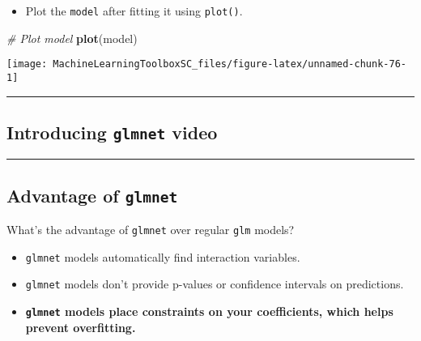 \documentclass[
]{book}
\newenvironment{Shaded}{\begin{snugshade}}{\end{snugshade}}
\newcommand{\CommentTok}[1]{\textcolor[rgb]{0.56,0.35,0.01}{\textit{#1}}}
\newcommand{\KeywordTok}[1]{\textcolor[rgb]{0.13,0.29,0.53}{\textbf{#1}}}
\newcommand{\NormalTok}[1]{#1}
\providecommand{\tightlist}{%
  \setlength{\itemsep}{0pt}\setlength{\parskip}{0pt}}
\begin{document}
\begin{itemize}
\tightlist
\item
  Plot the \texttt{model} after fitting it using \texttt{plot()}.
\end{itemize}

\begin{Shaded}
\begin{Highlighting}[]
\CommentTok{# Plot model}
\KeywordTok{plot}\NormalTok{(model)}
\end{Highlighting}
\end{Shaded}

\begin{center}\texttt{[image: MachineLearningToolboxSC\_files/figure-latex/unnamed-chunk-76-1]} \end{center}

\begin{center}\rule{0.5\linewidth}{0.5pt}\end{center}

\hypertarget{introducing-glmnet-video}{%
\subsection*{\texorpdfstring{Introducing \texttt{glmnet} video}{Introducing glmnet video}}\label{introducing-glmnet-video}}

\begin{center}\rule{0.5\linewidth}{0.5pt}\end{center}

\hypertarget{advantage-of-glmnet}{%
\subsection*{\texorpdfstring{Advantage of \texttt{glmnet}}{Advantage of glmnet}}\label{advantage-of-glmnet}}

What's the advantage of \texttt{glmnet} over regular \texttt{glm} models?

\begin{itemize}
\item
  \texttt{glmnet} models automatically find interaction variables.
\item
  \texttt{glmnet} models don't provide p-values or confidence intervals on predictions.
\item
  \textbf{\texttt{glmnet} models place constraints on your coefficients, which helps prevent overfitting.}
\end{itemize}
\end{document}
